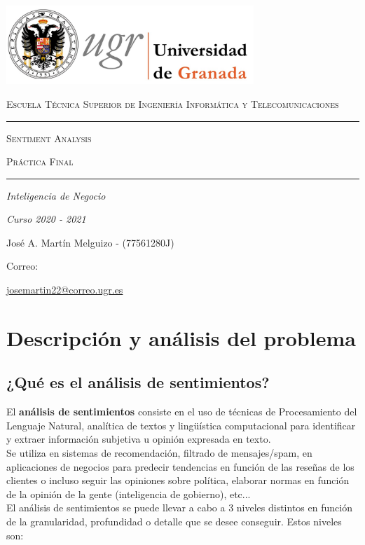 \documentclass[a4paper,12pt]{report}
\begin{document}
\begin{titlepage}
    \centering
    {\includegraphics[width=0.7\textwidth]{images/ugr.jpeg}\par}
    \vspace{1cm}
    {\scshape\Large Escuela Técnica Superior de Ingeniería Informática y Telecomunicaciones \par}
    \vspace{2.5cm}
    \hrule height 0.5pt
    \vspace{0.5cm}
    {\scshape\Huge Sentiment Analysis \par}
    \vspace{1cm}
    {\scshape\large Práctica Final \par}
    \vspace{0.5cm}
    \hrule height 0.5pt
    \vspace{4cm}
    {\itshape\Large Inteligencia de Negocio \par}
    \vspace{0.2cm}
    {\itshape\Large Curso 2020 - 2021 \par}
    \vfill
    {\Large José A. Martín Melguizo - (77561280J) \par}
    \vspace{0.5cm}
    {\large Correo:} {\href{correo}{josemartin22@correo.ugr.es} \par}
    \vfill
    
\end{titlepage}


\clearpage
\tableofcontents
\clearpage

\chapter{Descripción y análisis del problema}

\section{¿Qué es el análisis de sentimientos?}

El \textbf{análisis de sentimientos} consiste en el uso de técnicas de Procesamiento del Lenguaje Natural, analítica de textos y lingüística computacional para identificar y extraer información subjetiva u opinión expresada en texto. 
\vspace{2mm}\\
Se utiliza en sistemas de recomendación, filtrado de mensajes/spam, en aplicaciones de negocios para predecir tendencias en función de las reseñas de los clientes o incluso seguir las opiniones sobre política, elaborar normas en función de la opinión de la gente (inteligencia de gobierno), etc...
\vspace{2mm}\\
El análisis de sentimientos se puede llevar a cabo a 3 niveles distintos en función de la granularidad, profundidad o detalle que se desee conseguir. Estos niveles son:
\end{document}
